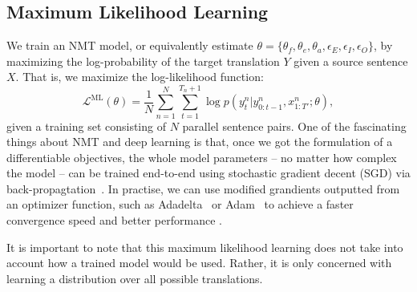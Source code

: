 \subsection{Maximum Likelihood Learning}
\label{cp2.sec.mle}
We train an NMT model, or equivalently estimate $\theta =\{\theta_f, \theta_e, \theta_a, \epsilon_E, \epsilon_I, \epsilon_O \}$, by maximizing the log-probability of the target translation $Y$ given a source sentence $X$. That is, we maximize the log-likelihood function:
\begin{equation}
	\label{cp2.eq.learning}
    \mathcal{L}^{\text{ML}}(\theta)  = \frac{1}{N} \sum_{n=1}^N \sum_{t=1}^{T_n+1} \log p(y_t^n| y_{0:t-1}^n, x_{1:T'}^n; \theta),
\end{equation}
given a training set consisting of $N$ parallel sentence pairs. One of the fascinating things about NMT and deep learning is that, once we got the formulation of a differentiable objectives, the whole model parameters -- no matter how complex the model -- can be trained end-to-end using stochastic gradient decent (SGD) via back-propagtation~\cite{rumelhart1986learning}. In practise, we can use modified grandients outputted from an optimizer function, such as Adadelta~\cite{zeiler2012adadelta} or Adam~\cite{kingma2014adam} to achieve a faster convergence speed and better performance .

It is important to note that this maximum likelihood learning does not take into account how a trained model would be used. Rather, it is only concerned with learning a distribution over all possible translations. 



